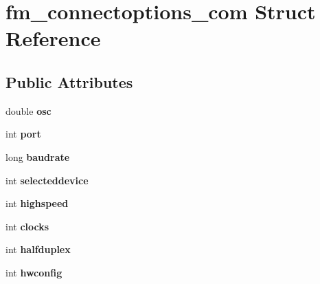 \hypertarget{structfm__connectoptions__com}{\section{fm\-\_\-connectoptions\-\_\-com Struct Reference}
\label{structfm__connectoptions__com}
}
\subsection*{Public Attributes}
\begin{DoxyCompactItemize}
\item 
\hypertarget{structfm__connectoptions__com_ae4ba59f4626d01d6483df50c9fcd7d5c}{double {\bfseries osc}}\label{structfm__connectoptions__com_ae4ba59f4626d01d6483df50c9fcd7d5c}

\item 
\hypertarget{structfm__connectoptions__com_af558b743b914bae2232f1195f055ad2b}{int {\bfseries port}}\label{structfm__connectoptions__com_af558b743b914bae2232f1195f055ad2b}

\item 
\hypertarget{structfm__connectoptions__com_acef5c48fc2615a837e7ddfa27283eb99}{long {\bfseries baudrate}}\label{structfm__connectoptions__com_acef5c48fc2615a837e7ddfa27283eb99}

\item 
\hypertarget{structfm__connectoptions__com_abfa68faa25905e4883b42ad59dc98ca5}{int {\bfseries selecteddevice}}\label{structfm__connectoptions__com_abfa68faa25905e4883b42ad59dc98ca5}

\item 
\hypertarget{structfm__connectoptions__com_af82fa819fafc77eaa9318281cb6ccc30}{int {\bfseries highspeed}}\label{structfm__connectoptions__com_af82fa819fafc77eaa9318281cb6ccc30}

\item 
\hypertarget{structfm__connectoptions__com_a7b73b2439a6a7312515f2f1784fdeabf}{int {\bfseries clocks}}\label{structfm__connectoptions__com_a7b73b2439a6a7312515f2f1784fdeabf}

\item 
\hypertarget{structfm__connectoptions__com_a734d67e56f983056a9487c2a508d7b43}{int {\bfseries halfduplex}}\label{structfm__connectoptions__com_a734d67e56f983056a9487c2a508d7b43}

\item 
\hypertarget{structfm__connectoptions__com_aa2b51e5671dda35557c985cc27e186a6}{int {\bfseries hwconfig}}\label{structfm__connectoptions__com_aa2b51e5671dda35557c985cc27e186a6}


\end{DoxyCompactItemize}
